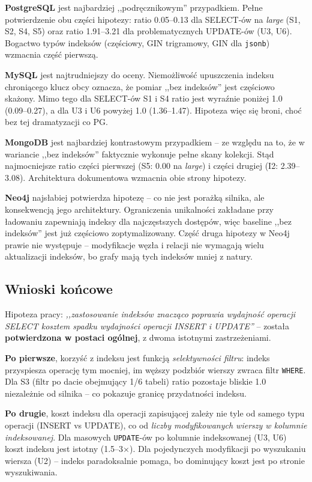 \textbf{PostgreSQL} jest najbardziej ,,podręcznikowym'' przypadkiem.
Pełne potwierdzenie obu części hipotezy: ratio 0.05--0.13 dla
SELECT-ów na \emph{large} (S1, S2, S4, S5) oraz ratio 1.91--3.21 dla
problematycznych UPDATE-ów (U3, U6). Bogactwo typów indeksów
(częściowy, GIN trigramowy, GIN dla \texttt{jsonb}) wzmacnia
część pierwszą.

\textbf{MySQL} jest najtrudniejszy do oceny. Niemożliwość upuszczenia
indeksu chroniącego klucz obcy oznacza, że pomiar ,,bez indeksów''
jest częściowo skażony. Mimo tego dla SELECT-ów S1 i S4 ratio jest
wyraźnie poniżej 1.0 (0.09--0.27), a dla U3 i U6 powyżej 1.0
(1.36--1.47). Hipoteza więc się broni, choć bez tej dramatyzacji
co PG.

\textbf{MongoDB} jest najbardziej kontrastowym przypadkiem -- ze
względu na to, że w wariancie ,,bez indeksów'' faktycznie wykonuje
pełne skany kolekcji. Stąd najmocniejsze ratio części pierwszej
(S5: 0.00 na \emph{large}) i części drugiej (I2: 2.39--3.08).
Architektura dokumentowa wzmacnia obie strony hipotezy.

\textbf{Neo4j} najsłabiej potwierdza hipotezę -- co nie jest porażką
silnika, ale konsekwencją jego architektury. Ograniczenia unikalności
zakładane przy ładowaniu zapewniają indeksy dla najczęstszych dostępów,
więc baseline ,,bez indeksów'' jest już częściowo zoptymalizowany.
Część druga hipotezy w Neo4j prawie nie występuje -- modyfikacje
węzła i relacji nie wymagają wielu aktualizacji indeksów, bo grafy
mają tych indeksów mniej z natury.

\subsection{Wnioski końcowe}

Hipoteza pracy: \emph{,,zastosowanie indeksów znacząco poprawia
wydajność operacji SELECT kosztem spadku wydajności operacji INSERT
i UPDATE''} -- została \textbf{potwierdzona w postaci ogólnej},
z dwoma istotnymi zastrzeżeniami.

\textbf{Po pierwsze}, korzyść z indeksu jest funkcją \emph{selektywności
filtru}: indeks przyspiesza operację tym mocniej, im węższy podzbiór
wierszy zwraca filtr \texttt{WHERE}. Dla S3 (filtr po dacie obejmujący
1/6 tabeli) ratio pozostaje bliskie 1.0 niezależnie od silnika -- co
pokazuje granicę przydatności indeksu.

\textbf{Po drugie}, koszt indeksu dla operacji zapisującej zależy
nie tyle od samego typu operacji (INSERT vs UPDATE), co od
\emph{liczby modyfikowanych wierszy w kolumnie indeksowanej}. Dla
masowych \texttt{UPDATE}-ów po kolumnie indeksowanej (U3, U6) koszt
indeksu jest istotny (1.5--3×). Dla pojedynczych modyfikacji
po wyszukaniu wiersza (U2) -- indeks paradoksalnie pomaga, bo
dominujący koszt jest po stronie wyszukiwania.

